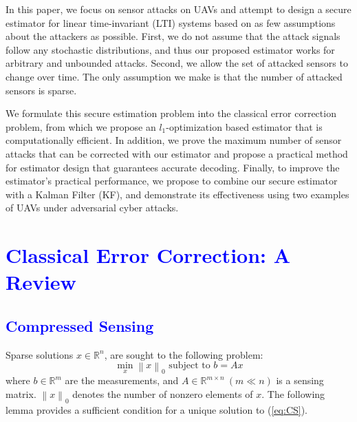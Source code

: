 \documentclass[12pt, conference, a4paper, twoside]{IEEEconf_mod}
\newcommand{\norm}[1]{\left\lVert#1\right\rVert}
\begin{document}
\pagestyle{empty}
In this paper, we focus on sensor attacks on UAVs and attempt to design a secure estimator for linear time-invariant (LTI) systems based on as few assumptions about the attackers as possible. First, we do not assume that the attack signals follow any stochastic distributions, and thus our proposed estimator works for arbitrary and unbounded attacks.
Second, we allow the set of attacked sensors to change over time.
The only assumption we make is that the number of attacked sensors is sparse.

We formulate this secure estimation problem into the classical error correction problem, from which we propose an $l_1$-optimization based estimator that is computationally efficient.
In addition, we prove the maximum number of sensor attacks that can be corrected with our estimator and propose a practical method for estimator design that guarantees accurate decoding.
Finally, to improve the estimator's practical performance, we propose to combine our secure estimator with a Kalman Filter (KF), and demonstrate its effectiveness using two examples of UAVs under adversarial cyber attacks.



\vspace{3mm}
\section{\textcolor{blue}{Classical Error Correction: A Review}}\label{sec_review}
\subsection{\textcolor{blue}{Compressed Sensing}}
Sparse solutions $x\in \mathbb{R}^n$, are sought to the following problem:
\begin{equation}
	\min_x \norm{x}_0 \text{ subject to } b= Ax
	\label{eq:CS}
\end{equation}
where $b \in \mathbb{R}^m$ are the measurements, and $A \in \mathbb{R}^{m\times n}~ (m \ll n)$ is a sensing matrix. $\norm{x}_0$ denotes the number of nonzero elements of $x$. The following lemma provides a sufficient condition for a unique solution to (\ref{eq:CS}).
\end{document}
